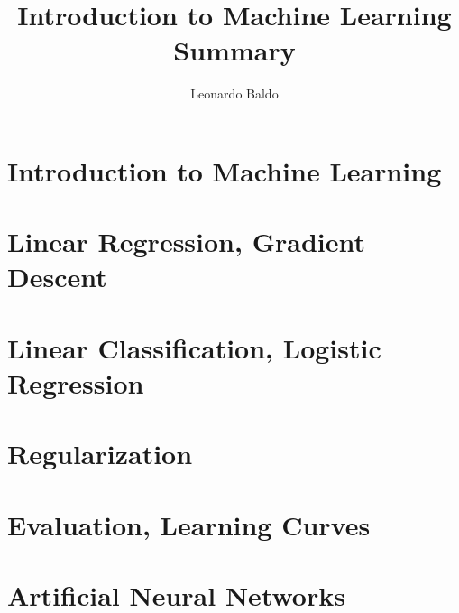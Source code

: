 \documentclass{article}
\title{Introduction to Machine Learning Summary}
\author{Leonardo Baldo}
\date{}
\begin{document}
\maketitle
\newpage

\tableofcontents
\newpage

\section{Introduction to Machine Learning}
\newpage

\section{Linear Regression, Gradient Descent}
\newpage

\section{Linear Classification, Logistic Regression}
\newpage

\section{Regularization}
\newpage

\section{Evaluation, Learning Curves}
\newpage

\section{Artificial Neural Networks}
\newpage
\end{document}
